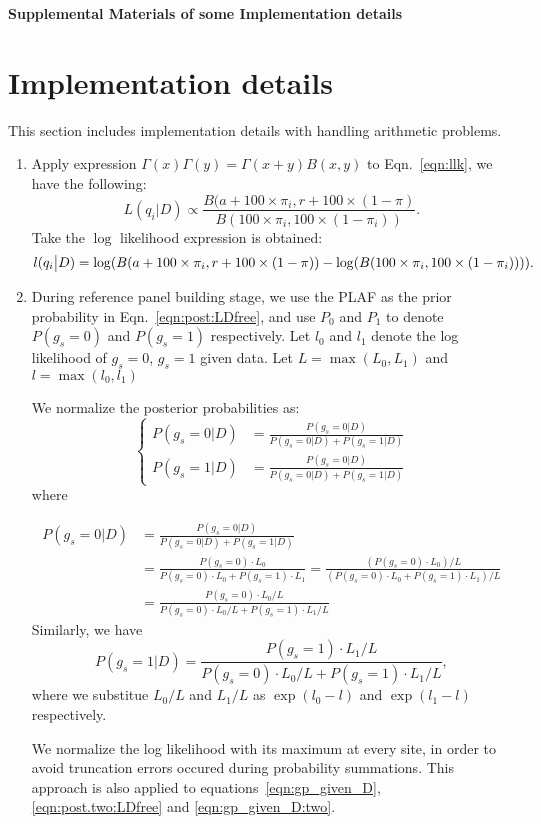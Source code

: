 
\begin{center}
\textbf{\large Supplemental Materials of some Implementation details}
\end{center}


\section{Implementation details}
This section includes implementation details with handling arithmetic problems.
\begin{enumerate}
\item Apply expression $\Gamma(x)\Gamma(y) = \Gamma(x+y)B(x,y)$ \citep{wiki:GammatoBeta:sup} to Eqn.~\eqref{eqn:llk}, we have the following:
$$L(q_{i} | D) \propto \frac{B(a + 100 \times \pi_i, r+100\times(1-\pi)}{B(100\times \pi_i, 100\times(1-\pi_i))}.$$
Take the $\log$ likelihood expression is obtained:
$$ l(q_i \big{|} D) = \log (B(a + 100 \times \pi_i, r+100\times(1-\pi)) - \log (B(100\times \pi_i, 100\times(1-\pi_i)))).$$

\item During reference panel building stage, we use the PLAF as the prior probability in Eqn.~\eqref{eqn:post:LDfree}, and use $P_0$ and $P_1$ to denote $P(g_s = 0)$ and $P(g_s = 1)$ respectively.
Let $l_0$ and $l_1$ denote the log likelihood of $g_s = 0$, $g_s = 1$ given data. Let $L = \max(L_0, L_1) $ and $ l = \max(l_0, l_1) $

We normalize the posterior probabilities as:
$$\begin{cases}
P(g_s = 0 | D) & = \frac{P(g_s = 0 | D)}{P(g_s = 0 | D) + P(g_s = 1 | D)} \\
P(g_s = 1 | D) & = \frac{P(g_s = 0 | D)}{P(g_s = 0 | D) + P(g_s = 1 | D)}
\end{cases}
$$
where

\begin{align*}
P(g_s = 0 | D) & = \frac{P(g_s = 0 | D)}{P(g_s = 0 | D) + P(g_s = 1 | D)} \\
               & = \frac{P(g_s = 0)\cdot L_0}{P(g_s = 0)\cdot L_0 + P(g_s = 1)\cdot L_1} = \frac{(P(g_s = 0)\cdot L_0)/L}{(P(g_s = 0)\cdot L_0 + P(g_s = 1)\cdot L_1)/L} \\
               & = \frac{P(g_s = 0)\cdot L_0/L}{P(g_s = 0)\cdot L_0/L + P(g_s = 1)\cdot L_1/L}
\end{align*}
Similarly, we have $$P(g_s = 1 | D) = \frac{P(g_s = 1)\cdot L_1/L}{P(g_s = 0)\cdot L_0/L + P(g_s = 1)\cdot L_1/L},$$
where we substitue $L_0/L$ and $L_1/L$ as $\exp(l_0 - l)$ and $\exp(l_1 - l)$ respectively.

We normalize the log likelihood with its maximum at every site, in order to avoid truncation errors occured during probability summations. This approach is also applied to equations~\eqref{eqn:gp_given_D}, \eqref{eqn:post.two:LDfree} and \eqref{eqn:gp_given_D:two}.
\end{enumerate}
